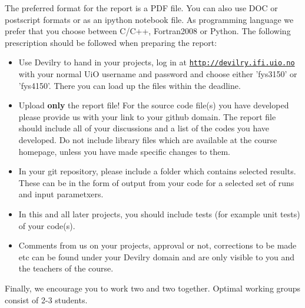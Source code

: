 \documentclass[%
oneside,                 %
final,                   %
10pt]{article}
\begin{document}
The preferred format for the report is a PDF file. You can also use DOC or postscript formats or as an ipython notebook file.  As programming language we prefer that you choose between C/C++, Fortran2008 or Python. The following prescription should be followed when preparing the report:

\begin{itemize}
  \item Use Devilry to hand in your projects, log in  at  \href{{http://devilry.ifi.uio.no}}{\nolinkurl{http://devilry.ifi.uio.no}} with your normal UiO username and password and choose either 'fys3150' or 'fys4150'. There you can load up the files within the deadline.

  \item Upload \textbf{only} the report file!  For the source code file(s) you have developed please provide us with your link to your github domain.  The report file should include all of your discussions and a list of the codes you have developed.  Do not include library files which are available at the course homepage, unless you have made specific changes to them.

  \item In your git repository, please include a folder which contains selected results. These can be in the form of output from your code for a selected set of runs and input parametxers.

  \item In this and all later projects, you should include tests (for example unit tests) of your code(s).

  \item Comments  from us on your projects, approval or not, corrections to be made  etc can be found under your Devilry domain and are only visible to you and the teachers of the course.
\end{itemize}

\noindent
Finally, 
we encourage you to work two and two together. Optimal working groups consist of 
2-3 students. 









\end{document}
